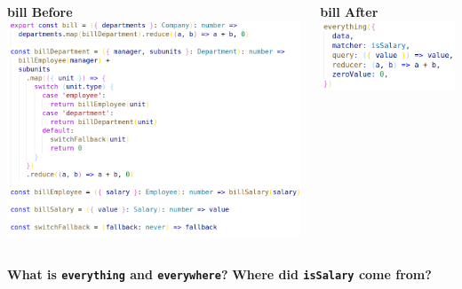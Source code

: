 \documentclass[14pt]{beamer}
\begin{document}
\begin{frame}
  \begin{columns}
    \begin{column}{.5\textwidth}
      \vspace{1em}
      \centering\textbf{bill Before}
      \includegraphics[height=0.7\textheight,width=\textwidth,keepaspectratio]{graphics/bill-naive-ts.png}
    \end{column}
    \begin{column}{.5\textwidth}
      \vspace{1em}
      \centering\textbf{bill After}
      \includegraphics[height=0.7\textheight,width=\textwidth,keepaspectratio]{graphics/bill-slim-ts.png}
    \end{column}
  \end{columns}
\end{frame}

\begin{frame}
  \vfill
    \centering\textbf{What is \texttt{everything} and \texttt{everywhere}?}
  \vfill
    \textbf{Where did \texttt{isSalary} come from?}
  \vfill
\end{frame}
\end{document}
